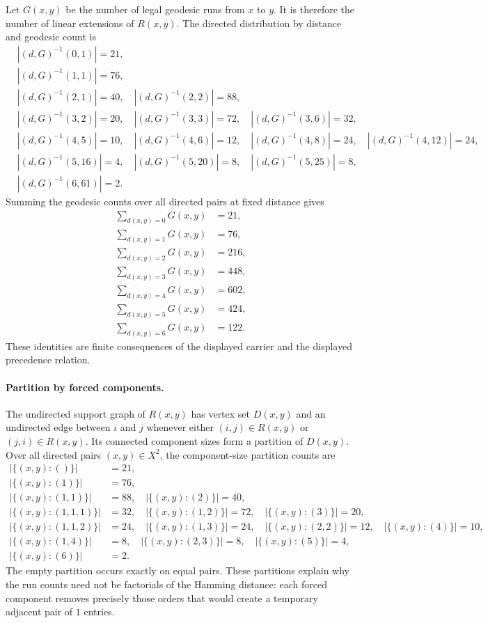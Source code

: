 Let $G(x,y)$ be the number of legal geodesic runs from $x$ to $y$. It is therefore the number of linear extensions of $R(x,y)$. The directed distribution by distance and geodesic count is
$$
\begin{aligned}
&|(d,G)^{-1}(0,1)|=21,\\
&|(d,G)^{-1}(1,1)|=76,\\
&|(d,G)^{-1}(2,1)|=40,\quad |(d,G)^{-1}(2,2)|=88,\\
&|(d,G)^{-1}(3,2)|=20,\quad |(d,G)^{-1}(3,3)|=72,\quad |(d,G)^{-1}(3,6)|=32,\\
&|(d,G)^{-1}(4,5)|=10,\quad |(d,G)^{-1}(4,6)|=12,\quad |(d,G)^{-1}(4,8)|=24,\quad |(d,G)^{-1}(4,12)|=24,\\
&|(d,G)^{-1}(5,16)|=4,\quad |(d,G)^{-1}(5,20)|=8,\quad |(d,G)^{-1}(5,25)|=8,\\
&|(d,G)^{-1}(6,61)|=2.
\end{aligned}
$$
Summing the geodesic counts over all directed pairs at fixed distance gives
$$
\begin{aligned}
\sum_{d(x,y)=0}G(x,y)&=21,\\
\sum_{d(x,y)=1}G(x,y)&=76,\\
\sum_{d(x,y)=2}G(x,y)&=216,\\
\sum_{d(x,y)=3}G(x,y)&=448,\\
\sum_{d(x,y)=4}G(x,y)&=602,\\
\sum_{d(x,y)=5}G(x,y)&=424,\\
\sum_{d(x,y)=6}G(x,y)&=122.
\end{aligned}
$$
These identities are finite consequences of the displayed carrier and the displayed precedence relation.

\paragraph{Partition by forced components.}
The undirected support graph of $R(x,y)$ has vertex set $D(x,y)$ and an undirected edge between $i$ and $j$ whenever either $(i,j)\in R(x,y)$ or $(j,i)\in R(x,y)$. Its connected component sizes form a partition of $D(x,y)$. Over all directed pairs $(x,y)\in X^2$, the component-size partition counts are
$$
\begin{aligned}
|\{(x,y):()\}|&=21,\\
|\{(x,y):(1)\}|&=76,\\
|\{(x,y):(1,1)\}|&=88,\quad |\{(x,y):(2)\}|=40,\\
|\{(x,y):(1,1,1)\}|&=32,\quad |\{(x,y):(1,2)\}|=72,\quad |\{(x,y):(3)\}|=20,\\
|\{(x,y):(1,1,2)\}|&=24,\quad |\{(x,y):(1,3)\}|=24,\quad |\{(x,y):(2,2)\}|=12,\quad |\{(x,y):(4)\}|=10,\\
|\{(x,y):(1,4)\}|&=8,\quad |\{(x,y):(2,3)\}|=8,\quad |\{(x,y):(5)\}|=4,\\
|\{(x,y):(6)\}|&=2.
\end{aligned}
$$
The empty partition occurs exactly on equal pairs. These partitions explain why the run counts need not be factorials of the Hamming distance: each forced component removes precisely those orders that would create a temporary adjacent pair of $1$ entries.

